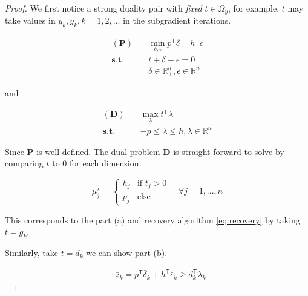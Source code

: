 \documentclass[../main]{subfiles}
\begin{document}
\begin{proof}
  We first notice a strong duality pair with \emph{fixed} \(t \in \Omega_y\), for example,
  \(t\) may take values in \(y_k, \bar y_k, k=1, 2, ...\) in the subgradient iterations.

  \begin{equation}\label{eq:recovery_primal}
    \begin{aligned}
      \mathbf{(P)}  \quad & \min_{\delta, \epsilon} p^\mathsf{T} \delta + h^\mathsf{T} \epsilon \\
      \mathbf{s.t.} \quad & t + \delta - \epsilon = 0                                           \\
                          & \delta \in \mathbb{R}_+^n, \epsilon \in \mathbb{R}_+^n
    \end{aligned}
  \end{equation}

  and

  \begin{equation}\label{eq:recovery_dual}
    \begin{aligned}
      \mathbf{(D)}  \quad & \max_{\lambda} t^\mathsf{T} \lambda            \\
      \mathbf{s.t.} \quad & -p \le \lambda \le h, \lambda \in \mathbb{R}^n
    \end{aligned}
  \end{equation}

  Since \textbf{P} is well-defined.
  The dual problem \textbf{D} is straight-forward to solve by comparing \(t\) to \(0\) for each dimension:

  \[\mu_j^\star =
    \begin{cases}
      h_j & \text{if } t_j > 0 \\
      p_j & \text{else}
    \end{cases}
    \quad \forall j = 1, ..., n\]

  This corresponds to the part (a) and recovery algorithm \eqref{eq:recovery} by taking \(t = g_k\).

  Similarly, take \(t = d_k\) we can show part (b).


  \[\begin{aligned}
       & \bar z_k = p^\mathsf{T} \bar \delta_k + h^\mathsf{T} \bar \epsilon_k
      \ge  d_k^\mathsf{T} \lambda_k
    \end{aligned}\]

\end{proof}
\end{document}
